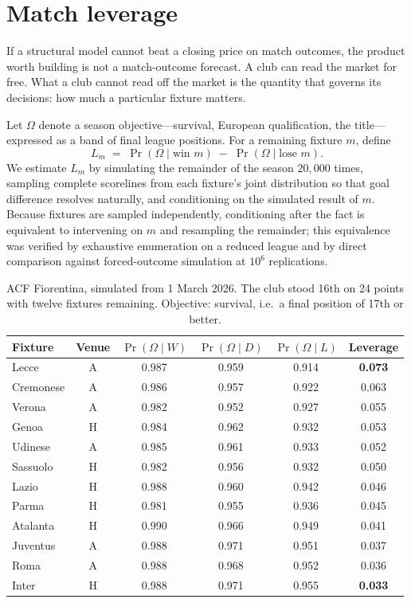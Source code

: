 \documentclass[11pt]{article}
\begin{document}
\section{Match leverage}
\label{sec:leverage}

If a structural model cannot beat a closing price on match outcomes, the product
worth building is not a match-outcome forecast. A club can read the market for
free. What a club cannot read off the market is the quantity that governs its
decisions: how much a particular fixture matters.

Let $\Omega$ denote a season objective---survival, European qualification, the
title---expressed as a band of final league positions. For a remaining fixture
$m$, define
\begin{equation}
L_m \;=\; \Pr\!\left(\Omega \mid \text{win } m\right) \;-\;
          \Pr\!\left(\Omega \mid \text{lose } m\right).
\end{equation}
We estimate $L_m$ by simulating the remainder of the season $20{,}000$ times,
sampling complete scorelines from each fixture's joint distribution so that goal
difference resolves naturally, and conditioning on the simulated result of $m$.
Because fixtures are sampled independently, conditioning after the fact is
equivalent to intervening on $m$ and resampling the remainder; this equivalence
was verified by exhaustive enumeration on a reduced league and by direct
comparison against forced-outcome simulation at $10^{6}$ replications.

\begin{table}[t]
\centering
\caption{ACF Fiorentina, simulated from 1 March 2026. The club stood 16th on 24
points with twelve fixtures remaining. Objective: survival, i.e.\ a final
position of 17th or better.}
\label{tab:leverage}
\small
\begin{tabular}{lccccc}
\toprule
Fixture & Venue & $\Pr(\Omega \mid W)$ & $\Pr(\Omega \mid D)$ & $\Pr(\Omega \mid L)$ & Leverage \\
\midrule
Lecce      & A & 0.987 & 0.959 & 0.914 & \textbf{0.073} \\
Cremonese  & A & 0.986 & 0.957 & 0.922 & 0.063 \\
Verona     & A & 0.982 & 0.952 & 0.927 & 0.055 \\
Genoa      & H & 0.984 & 0.962 & 0.932 & 0.053 \\
Udinese    & A & 0.985 & 0.961 & 0.933 & 0.052 \\
Sassuolo   & H & 0.982 & 0.956 & 0.932 & 0.050 \\
Lazio      & H & 0.988 & 0.960 & 0.942 & 0.046 \\
Parma      & H & 0.981 & 0.955 & 0.936 & 0.045 \\
Atalanta   & H & 0.990 & 0.966 & 0.949 & 0.041 \\
Juventus   & A & 0.988 & 0.971 & 0.951 & 0.037 \\
Roma       & A & 0.988 & 0.968 & 0.952 & 0.036 \\
Inter      & H & 0.988 & 0.971 & 0.955 & \textbf{0.033} \\
\bottomrule
\end{tabular}
\end{table}
\end{document}
